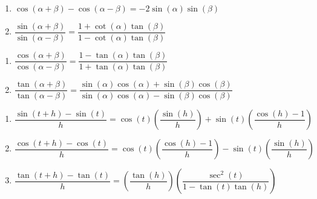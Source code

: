\begin{multicols}{2}

\begin{enumerate}

\setcounter{enumi}{\value{HW}}

\item $\cos(\alpha + \beta) - \cos(\alpha - \beta) = -2\sin(\alpha) \sin(\beta)$ \vphantom{$\dfrac{\sin(\alpha+\beta)}{\sin(\alpha-\beta)}$}
\item $\dfrac{\sin(\alpha+\beta)}{\sin(\alpha-\beta)} = \dfrac{1+\cot(\alpha) \tan(\beta)}{1 - \cot(\alpha) \tan(\beta)}$ 

\setcounter{HW}{\value{enumi}}

\end{enumerate}

\end{multicols}

\begin{multicols}{2}

\begin{enumerate}

\setcounter{enumi}{\value{HW}}

\item $\dfrac{\cos(\alpha + \beta)}{\cos(\alpha - \beta)} = \dfrac{1 - \tan(\alpha)\tan(\beta)}{1 + \tan(\alpha)\tan(\beta)}$
\item $\dfrac{\tan(\alpha + \beta)}{\tan(\alpha - \beta)} = \dfrac{\sin(\alpha)\cos(\alpha) + \sin(\beta)\cos(\beta)}{\sin(\alpha)\cos(\alpha) - \sin(\beta)\cos(\beta)}$

\setcounter{HW}{\value{enumi}}

\end{enumerate}

\end{multicols}

\begin{enumerate}

\setcounter{enumi}{\value{HW}}

\item $\dfrac{\sin(t + h) - \sin(t)}{h} = \cos(t) \left(\dfrac{\sin(h)}{h} \right) + \sin(t) \left( \dfrac{\cos(h) - 1}{h} \right)$
\item $\dfrac{\cos(t + h) - \cos(t)}{h} = \cos(t) \left( \dfrac{\cos(h) - 1}{h} \right) - \sin(t) \left(\dfrac{\sin(h)}{h} \right)$
\item  $\dfrac{\tan(t + h) - \tan(t)}{h} = \left( \dfrac{\tan(h)}{h} \right) \left(\dfrac{\sec^{2}(t)}{1 - \tan(t)\tan(h)} \right)$ \label{identlastident}

\setcounter{HW}{\value{enumi}}

\end{enumerate}

